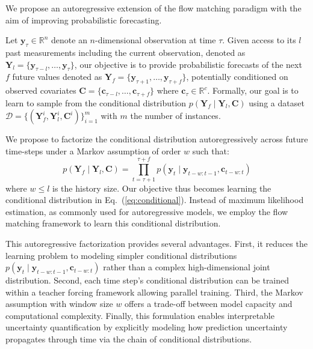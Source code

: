 \documentclass[a4paper,10pt,twocolumn,preprint,3p]{elsarticle}
\begin{document}
We propose an autoregressive extension of the flow matching paradigm with the aim of improving probabilistic forecasting. 

Let $\mathbf{y}_\tau \in \mathbb{R}^n$ denote an $n$-dimensional observation at time $\tau$. Given access to its $l$ past measurements including the current observation, denoted as $\mathbf{Y}_l = \{\mathbf{y}_{\tau - l}, \ldots, \mathbf{y}_{\tau}\}$, our objective is to provide probabilistic forecasts of the next $f$ future values denoted as $\mathbf{Y}_f = \{\mathbf{y}_{\tau+1}, \ldots, \mathbf{y}_{\tau+f}\}$, potentially conditioned on observed covariates $\mathbf{C} = \{\mathbf{c}_{\tau - l}, \ldots,\mathbf{c}_{\tau+f}\}$ where $\mathbf{c}_\tau \in \mathbb{R}^c$. Formally, our goal is to learn to sample from the conditional distribution $p(\mathbf{Y}_f \mid \mathbf{Y}_l, \mathbf{C})$ using a dataset $\mathcal{D}=\{(\mathbf{Y}^i_f, \mathbf{Y}^i_l, \mathbf{C}^i)\}_{i=1}^{m}$ with $m$ the number of instances.


We propose to factorize the conditional distribution autoregressively across future time-steps under a Markov assumption of order $w$ such that:
\begin{equation}
p(\mathbf{Y}_f \mid \mathbf{Y}_l, \mathbf{C}) = \prod_{t=\tau+1}^{\tau+f} p(\mathbf{y}_{t} \mid \mathbf{y}_{t-w:t-1}, \mathbf{c}_{t-w:t})
\label{eq:conditional}
\end{equation}
where  $w \le l$ is the history size. %
Our objective thus becomes learning the conditional distribution in Eq.~(\ref{eq:conditional}). 
Instead of maximum likelihood estimation, as commonly used for autoregressive models, we employ the flow matching framework to learn this conditional distribution.


This autoregressive factorization provides several advantages. First, it reduces the learning problem to modeling simpler conditional distributions $p(\mathbf{y}_{t} \mid \mathbf{y}_{t-w:t-1}, \mathbf{c}_{t-w:t})$ rather than a complex high-dimensional joint distribution. Second, each time step's conditional distribution can be trained within a teacher forcing framework allowing parallel training. Third, the Markov assumption with window size $w$ offers a trade-off between model capacity and computational complexity. Finally, this formulation enables interpretable uncertainty quantification by explicitly modeling how prediction uncertainty propagates through time via the chain of conditional distributions. 
\end{document}
